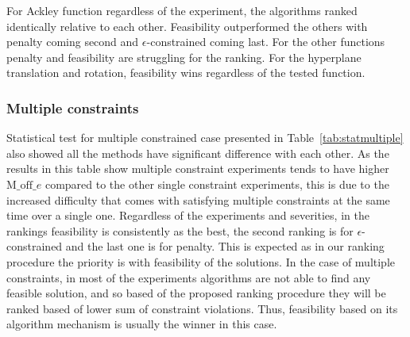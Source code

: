\documentclass[conference]{IEEEtran}
\begin{document}
For Ackley function regardless of the experiment, the algorithms ranked identically relative to each other. Feasibility outperformed the others with penalty coming second and $\epsilon$-constrained coming last. For the other functions penalty and feasibility are struggling for the ranking. For the hyperplane translation and rotation, feasibility wins regardless of the tested function.
\subsubsection{Multiple constraints}
Statistical test for multiple constrained case presented in Table~\ref{tab:statmultiple} also showed all the methods have significant difference with each other. As the results in this table show multiple constraint experiments tends to have higher $\text{M\_off}\_e$ compared to the other single constraint experiments, this is due to the increased difficulty that comes with satisfying multiple constraints at the same time over a single one. 
Regardless of the experiments and severities, in the rankings feasibility is consistently as the best, the second ranking is for $\epsilon$-constrained and the last one is for penalty. This is expected as in our ranking procedure the priority is with feasibility of the solutions. In the case of multiple constraints, in most of the experiments algorithms are not able to find any feasible solution, and so based of the proposed ranking procedure they will be ranked based of lower sum of constraint violations. Thus, feasibility based on its algorithm mechanism is usually the winner in this case.
\end{document}
